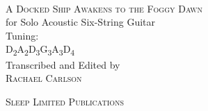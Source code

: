 \begin{titlepage}
    \begin{center}
        \vspace*{1.73cm}
        \textsc{}\\[3cm]
        \textsc{\Huge A Docked Ship Awakens to the Foggy Dawn}\\[.5cm]
        for Solo Acoustic Six-String Guitar\\[.5cm]
        Tuning:\\
        D\textsubscript{2}A\textsubscript{2}D\textsubscript{3}G\textsubscript{3}A\textsubscript{3}D\textsubscript{4}\\[3cm]
        Transcribed and Edited by\\
        \textsc{Rachael Carlson}\\
        \date{}
        \vfill
        \textsc{Sleep Limited Publications}


    \end{center}

\end{titlepage}
